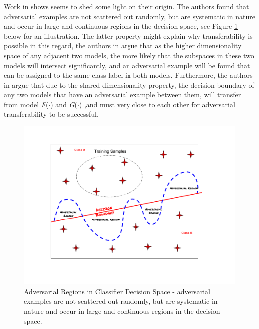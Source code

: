 \documentclass[grad,lot,lof,11pt,oneside,onehalfspace]{RUthesis}
\begin{document}
Work in \cite{goodfellow_explaining_2015} shows seems to shed some light on their origin. The authors found that adversarial examples are not scattered out randomly, but are systematic in nature and occur in large and continuous regions in the decision space, see Figure \ref{fig:DecisionBoundary} below for an illustration. The latter property might explain why transferability is possible in this regard, the authors in \cite{goodfellow_explaining_2015} argue that as the higher dimensionality space of any adjacent two models, the more likely that the subspaces in these two models will intersect significantly, and an adversarial example will be found that can be assigned to the same class label in both models. Furthermore, the authors in \cite{tramer_space_2017} argue that due to the shared dimensionality property, the decision boundary of any two models that have an adversarial example between them, will transfer from model  \textit{F}($\cdot$) and \textit{G}($\cdot$) ,and must very close to each other for adversarial transferability to  be successful. 
\begin{figure}[h]
\centering
\includegraphics[width=0.95\linewidth]{"Images/Chapter 2/DecisionBoundary"}
\caption{Adversarial Regions in Classifier Decision Space - adversarial examples are not scattered out randomly, but are systematic in nature and occur in large and continuous regions in the decision space. }
\label{fig:DecisionBoundary}
\end{figure}
\end{document}
